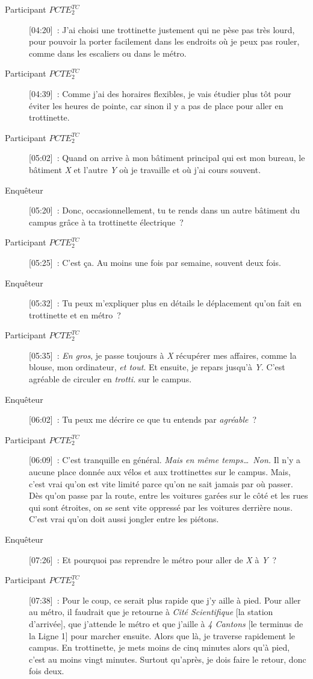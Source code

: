 \begin{description}
    \item[Participant \(PCTE^{TC}_{2}\)] [04:20]~: J'ai choisi une trottinette justement qui ne pèse pas très lourd, pour pouvoir la porter facilement dans les endroits où je peux pas rouler, comme dans les escaliers ou dans le métro.
    \item[Participant \(PCTE^{TC}_{2}\)] [04:39]~: Comme j'ai des horaires flexibles, je vais étudier plus tôt pour éviter les heures de pointe, car sinon il y a pas de place pour aller en trottinette.
    \item[Participant \(PCTE^{TC}_{2}\)] [05:02]~: Quand on arrive à mon bâtiment principal qui est mon bureau, le bâtiment \textsl{X} et l'autre \textsl{Y} où je travaille et où j'ai cours souvent.
    \item[Enquêteur] [05:20]~: Donc, occasionnellement, tu te rends dans un autre bâtiment du campus grâce à ta trottinette électrique~?
    \item[Participant \(PCTE^{TC}_{2}\)] [05:25]~: C'est ça. Au moins une fois par semaine, souvent deux fois.
    \item[Enquêteur] [05:32]~: Tu peux m'expliquer plus en détails le déplacement qu'on fait en trottinette et en métro~?
    \item[Participant \(PCTE^{TC}_{2}\)] [05:35]~: \textsl{En gros}, je passe toujours à \textsl{X} récupérer mes affaires, comme la blouse, mon ordinateur, \textsl{et tout}. Et ensuite, je repars jusqu'à \textsl{Y}. C'est agréable de circuler en \textsl{trotti.} sur le campus.
    \item[Enquêteur] [06:02]~: Tu peux me décrire ce que tu entends par \textsl{agréable}~?
    \item[Participant \(PCTE^{TC}_{2}\)] [06:09]~: C'est tranquille en général. \textsl{Mais en même temps\dots~Non.} Il n’y a aucune place donnée aux vélos et aux trottinettes sur le campus. Mais, c’est vrai qu’on est vite limité parce qu’on ne sait jamais par où passer. Dès qu’on passe par la route, entre les voitures garées sur le côté et les rues qui sont étroites, on se sent vite oppressé par les voitures derrière nous. C’est vrai qu’on doit aussi jongler entre les piétons.
    \item[Enquêteur] [07:26]~: Et pourquoi pas reprendre le métro pour aller de \textsl{X} à \textsl{Y}~?
    \item[Participant \(PCTE^{TC}_{2}\)] [07:38]~: Pour le coup, ce serait plus rapide que j’y aille à pied. Pour aller au métro, il faudrait que je retourne à \textsl{Cité Scientifique} [la station d'arrivée], que j’attende le métro et que j’aille à \textsl{4 Cantons} [le terminus de la Ligne 1] pour marcher ensuite. Alors que là, je traverse rapidement le campus. En trottinette, je mets moins de cinq minutes alors qu’à pied, c’est au moins vingt minutes. Surtout qu'après, je dois faire le retour, donc fois deux.

\end{description}
